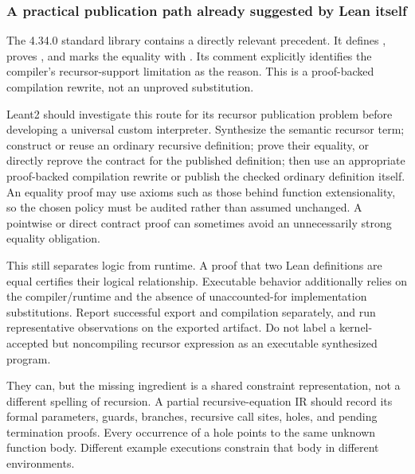 \subsubsection*{A practical publication path already suggested by Lean itself}

The 4.34.0 standard library contains a directly relevant precedent. It defines , proves , and marks the equality with . Its comment explicitly identifies the compiler's recursor-support limitation as the reason. This is a proof-backed compilation rewrite, not an unproved  substitution.\cite{leannat}

Leant2 should investigate this route for its recursor publication problem before developing a universal custom interpreter. Synthesize the semantic recursor term; construct or reuse an ordinary recursive definition; prove their equality, or directly reprove the contract for the published definition; then use an appropriate proof-backed compilation rewrite or publish the checked ordinary definition itself. An equality proof may use axioms such as those behind function extensionality, so the chosen policy must be audited rather than assumed unchanged. A pointwise or direct contract proof can sometimes avoid an unnecessarily strong equality obligation.

This still separates logic from runtime. A proof that two Lean definitions are equal certifies their logical relationship. Executable behavior additionally relies on the compiler/runtime and the absence of unaccounted-for implementation substitutions. Report successful export and compilation separately, and run representative observations on the exported artifact. Do not label a kernel-accepted but noncompiling recursor expression as an executable synthesized program.


\answer They can, but the missing ingredient is a shared constraint representation, not a different spelling of recursion. A partial recursive-equation IR should record its formal parameters, guards, branches, recursive call sites, holes, and pending termination proofs. Every occurrence of a hole points to the same unknown function body. Different example executions constrain that body in different environments.

